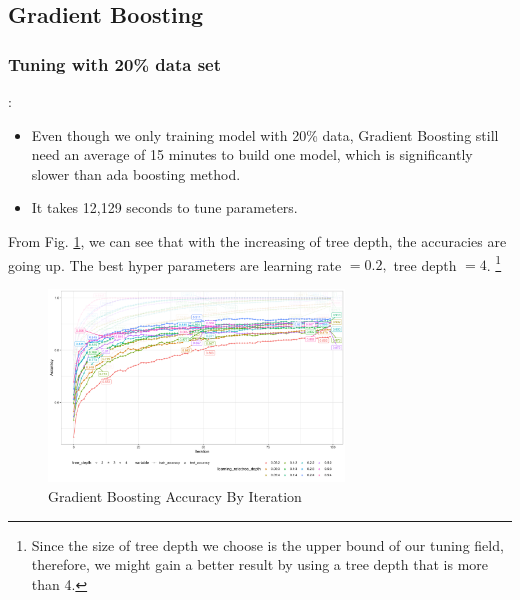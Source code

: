 \documentclass[8pt]{beamer}
\let\oldfootnote\footnote
\renewcommand\footnote[1][]{\oldfootnote[frame,#1]}
\begin{document}
\subsection{Gradient Boosting}
\subsubsection{Tuning with 20\% data set}
\begin{frame}[allowframebreaks]{\secname : \subsecname}{\subsubsecname}
\begin{itemize}
  \item Even though we only training model with 20\% data, Gradient Boosting still need an average of 15 minutes to build one model, which is significantly slower than ada boosting method. 
  \item It takes 12,129 seconds to tune parameters. 
\end{itemize}

\framebreak
From Fig. \ref{Gradient Boosting Accuracy By Iteration}, we can see that with the increasing of tree depth, the accuracies are going up. The best hyper parameters are learning rate $=0.2,$ tree depth $=4$. \footnote{Since the size of tree depth we choose is the upper bound of our tuning field, therefore, we might gain a better result by using a tree depth that is more than 4.}
\begin{figure}[htbp]
\centerline{\includegraphics[width=0.7\textwidth]{figure/Gradient Boosting Accuracy By Iteration.png}}
\caption{Gradient Boosting Accuracy By Iteration}
\label{Gradient Boosting Accuracy By Iteration}
\end{figure}	
\end{frame}
\end{document}
